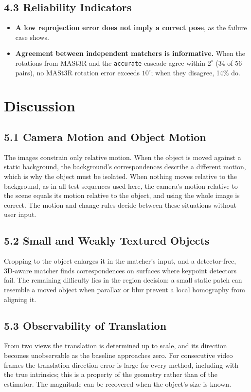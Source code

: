 \documentclass[10pt,a4paper,twocolumn]{article}
\begin{document}
\subsection*{4.3 Reliability Indicators}
\begin{itemize}
  \item \textbf{A low reprojection error does not imply a correct pose}, as the failure case shows.
  \item \textbf{Agreement between independent matchers is informative.} When the rotations from MASt3R and the \texttt{accurate} cascade agree within $2^\circ$ (34 of 56 pairs), no MASt3R rotation error exceeds $10^\circ$; when they disagree, 14\% do.
\end{itemize}

\section{Discussion}

\subsection*{5.1 Camera Motion and Object Motion}
The images constrain only relative motion. When the object is moved against a static background, the background's correspondences describe a different motion, which is why the object must be isolated. When nothing moves relative to the background, as in all test sequences used here, the camera's motion relative to the scene equals its motion relative to the object, and using the whole image is correct. The motion and change rules decide between these situations without user input.

\subsection*{5.2 Small and Weakly Textured Objects}
Cropping to the object enlarges it in the matcher's input, and a detector-free, 3D-aware matcher finds correspondences on surfaces where keypoint detectors fail. The remaining difficulty lies in the region decision: a small static patch can resemble a moved object when parallax or blur prevent a local homography from aligning it.

\subsection*{5.3 Observability of Translation}
From two views the translation is determined up to scale, and its direction becomes unobservable as the baseline approaches zero. For consecutive video frames the translation-direction error is large for every method, including with the true intrinsics; this is a property of the geometry rather than of the estimator. The magnitude can be recovered when the object's size is known.
\end{document}
